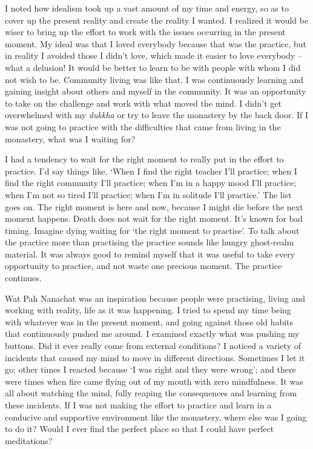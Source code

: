 I noted how idealism took up a vast amount of my time and energy, so as
to cover up the present reality and create the reality I wanted. I
realized it would be wiser to bring up the effort to work with the
issues occurring in the present moment. My ideal was that I loved
everybody because that was the practice, but in reality I avoided those
I didn't love, which made it easier to love everybody -- what a delusion! 
It would be better to learn to be with people with whom I did not wish
to be. Community living was like that. I was continuously learning and
gaining insight about others and myself in the community. It was an
opportunity to take on the challenge and work with what moved the mind. 
I didn't get overwhelmed with my \emph{dukkha} or try to leave the
monastery by the back door. If I was not going to practice with the
difficulties that came from living in the monastery, what was I waiting
for?

I had a tendency to wait for the right moment to really put in the
effort to practice. I'd say things like, `When I find the right teacher
I'll practice; when I find the right community I'll practice; when I'm
in a happy mood I'll practice; when I'm not so tired I'll practice; when
I'm in solitude I'll practice.' The list goes on. The right moment is
here and now, because I might die before the next moment happens. Death
does not wait for the right moment. It's known for bad timing. Imagine
dying waiting for `the right moment to practise'. To talk about the
practice more than practising the practice sounds like hungry
ghost-realm material. It was always good to remind myself that it was
useful to take every opportunity to practice, and not waste one precious
moment. The practice continues. 

Wat Pah Nanachat was an inspiration because people were practising, 
living and working with reality, life as it was happening. I tried to
spend my time being with whatever was in the present moment, and going
against those old habits that continuously pushed me around. I examined
exactly what was pushing my buttons. Did it ever really come from
external conditions? I noticed a variety of incidents that caused my
mind to move in different directions. Sometimes I let it go; other times
I reacted because `I was right and they were wrong'; and there were
times when fire came flying out of my mouth with zero mindfulness. It
was all about watching the mind, fully reaping the consequences and
learning from these incidents. If I was not making the effort to
practice and learn in a conducive and supportive environment like the
monastery, where else was I going to do it? Would I ever find the
perfect place so that I could have perfect meditations? 

